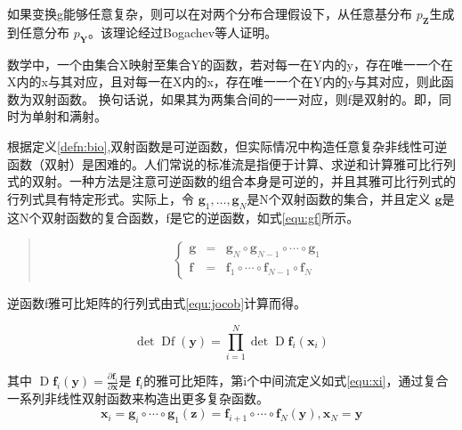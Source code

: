 如果变换g能够任意复杂，则可以在对两个分布合理假设下，从任意基分布 $p_{\mathbf{Z}}$生成到任意分布 $p_{\mathbf{Y}}$。该理论经过Bogachev等人证明。\cite{bogachevTriangularTransformationsMeasures2005,medvedevCERTAINPROPERTIESTRIANGULAR2008}


\begin{defn}[双射函数]\label{defn:bio}
	数学中，一个由集合X映射至集合Y的函数，若对每一在Y内的y，存在唯一一个在X内的x与其对应，且对每一在X内的x，存在唯一一个在Y内的y与其对应，则此函数为双射函数。 换句话说，如果其为两集合间的一一对应，则f是双射的。即，同时为单射和满射。
\end{defn}

根据定义\ref{defn:bio},双射函数是可逆函数，但实际情况中构造任意复杂非线性可逆函数（双射）是困难的。人们常说的标准流是指便于计算、求逆和计算雅可比行列式的双射。一种方法是注意可逆函数的组合本身是可逆的，并且其雅可比行列式的行列式具有特定形式。实际上，令 $\mathbf{g}_{1}, \ldots, \mathbf{g}_{N}$是N个双射函数的集合，并且定义 $\mathbf{g}$是这N个双射函数的复合函数，f是它的逆函数，如式\ref{equ:gf}所示。
\begin{quotation}\label{equ:gf}
	\begin{eqnarray}
		\left\{\begin{matrix}
		\mathbf{g} & = & \mathbf{g}_{N} \circ \mathbf{g}_{N-1} \circ \cdots \circ \mathbf{g}_{1}
		\\
		\mathbf{f} & = & \mathbf{f}_{1} \circ \cdots \circ \mathbf{f}_{N-1} \circ \mathbf{f}_{N}
		\end{matrix}\right.
		\end{eqnarray}
\end{quotation}


逆函数f雅可比矩阵的行列式由式\ref{equ:jocob}计算而得。

\begin{equation}\label{equ:jocob}
    \operatorname{det} \operatorname{Df}(\mathbf{y})=\prod_{i=1}^{N} \operatorname{det} \operatorname{D} \mathbf{f}_{i}\left(\mathbf{x}_{i}\right)
\end{equation}

其中 $\operatorname{D}\mathbf{f}_{i}(\mathbf{y})=\frac{\partial \mathbf{f}_{i}}{\partial \mathbf{x}}$是 $\mathbf{f}_{i}$的雅可比矩阵，第i个中间流定义如式\ref{equ:xi}，通过复合一系列非线性双射函数来构造出更多复杂函数。
\begin{equation}\label{equ:xi}
	\mathbf{x}_{i}=\mathbf{g}_{i} \circ \cdots \circ \mathbf{g}_{1}(\mathbf{z})=\mathbf{f}_{i+1} \circ \cdots \circ \mathbf{f}_{N}(\mathbf{y}) ,  \mathbf{x}_{N} = \mathbf{y}
\end{equation}

